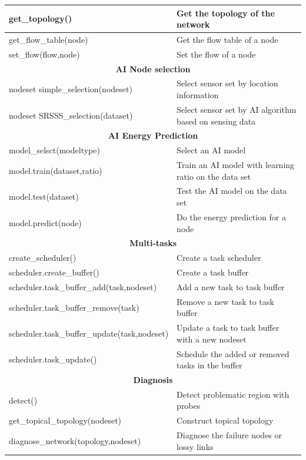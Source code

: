 \begin{table}[htbp]
{\begin{tabular}{|l|l|}
		get\_topology() & Get the topology of the network\\
		\hline
		get\_flow\_table(node) & Get the flow table of a node \\
		\hline
		set\_flow(flow,node) & Set the flow of a node \\
		\hline
		\multicolumn{2}{|c|}{\textbf{AI Node selection}}\\
		\hline
		nodeset simple\_selection(nodeset) & Select sensor set by location information\\
		\hline
		nodeset SRSSS\_selection(dataset) & Select sensor set by AI algorithm based on sensing data\\
		\hline
		\multicolumn{2}{|c|}{\textbf{AI Energy Prediction}}\\
		\hline
		model\_selsct(modeltype) & Select an AI model\\
		\hline
		model.train(dataset,ratio) & Train an AI model with learning ratio on the data set\\
		\hline
		model.test(dataset) & Test the AI model on the data set\\
		\hline
		model.predict(node) & Do the energy prediction for a node \\
		\hline
		\multicolumn{2}{|c|}{\textbf{Multi-tasks}}\\
		\hline
		create\_scheduler() & Create a task scheduler \\
		\hline
		scheduler.create\_buffer() & Create a task buffer \\
		\hline
		scheduler.task\_buffer\_add(task,nodeset) & Add a new task to task buffer \\
		\hline
		scheduler.task\_buffer\_remove(task) & Remove a new task to task buffer \\
		\hline
		scheduler.task\_buffer\_update(task,nodeset) & Update a task to task buffer with a new nodeset \\
		\hline
		scheduler.task\_update() & Schedule the added or removed tasks in the buffer\\
		\hline
		\multicolumn{2}{|c|}{\textbf{Diagnosis}}\\
		\hline
		detect() & Detect problematic region with probes \\
		\hline
		get\_topical\_topology(nodeset) & Construct topical topology\\
		\hline
		diagnose\_network(topology,nodeset) & Diagnose the failure nodes or lossy links\\
		\hline
	\end{tabular}
	}
\end{table}

